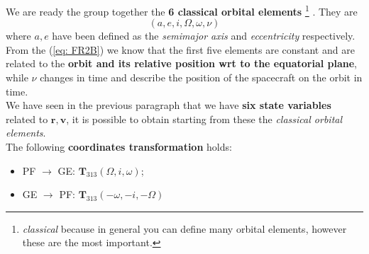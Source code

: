 We are ready the group together the \textbf{6 classical orbital elements}{
    \footnote[11]{
        \textit{classical} because in general you can define many orbital elements, however these are the most important.
    }
}. They are 
{\large{
    \begin{equation}
        (a, e, i, \Omega, \omega, \nu)
    \end{equation}
}}
where $a, e$ have been defined as the \textit{semimajor axis} and \textit{eccentricity} respectively. From the (\ref{eq: FR2B}) we know that the first five elements are constant and are related to the \textbf{orbit and its relative position wrt to the equatorial plane}, while $\nu$ changes in time and describe the position of the spacecraft on the orbit in time.\\
We have seen in the previous paragraph that we have \textbf{six state variables} related to $\mathbf{r}, \mathbf{v}$, it is possible to obtain starting from these the \textit{classical orbital elements}.\\
The following \textbf{coordinates transformation} holds:
{\large
\begin{itemize}
    \item \textsf{PF $\to$ GE}: $\mathbf{T}_{313}(\Omega,i,\omega)$; 
    \item \textsf{GE $\to$ PF}: $\mathbf{T}_{313}(-\omega, -i, -\Omega)$
\end{itemize}

}

